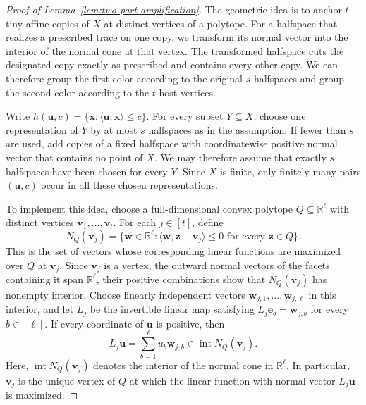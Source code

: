 \documentclass[11pt]{article}
\theoremstyle{definition}
\newcommand{\R}{\mathbb{R}}
\begin{document}
\begin{proof}[Proof of Lemma~\ref{lem:two-part-amplification}]
The geometric idea is to anchor \(t\) tiny affine copies of \(X\) at distinct vertices of a polytope. For a halfspace that realizes a prescribed trace on one copy, we transform its normal vector into the interior of the normal cone at that vertex. The transformed halfspace cuts the designated copy exactly as prescribed and contains every other copy. We can therefore group the first color according to the original \(s\) halfspaces and group the second color according to the \(t\) host vertices.

Write \(h(\boldsymbol{u},c)=\{\boldsymbol{x}:\langle\boldsymbol{u},\boldsymbol{x}\rangle\le c\}\). For every subset \(Y\subseteq X\), choose one representation of \(Y\) by at most \(s\) halfspaces as in the assumption. If fewer than \(s\) are used, add copies of a fixed halfspace with coordinatewise positive normal vector that contains no point of \(X\). We may therefore assume that exactly \(s\) halfspaces have been chosen for every \(Y\). Since \(X\) is finite, only finitely many pairs \((\boldsymbol{u},c)\) occur in all these chosen representations.

To implement this idea, choose a full-dimensional convex polytope \(Q\subseteq\R^{\ell}\) with distinct vertices \(\boldsymbol{v}_{1},\ldots,\boldsymbol{v}_{t}\). For each \(j\in[t]\), define
\[
N_{Q}(\boldsymbol{v}_{j})=\{\boldsymbol{w}\in\R^{\ell}:\langle\boldsymbol{w},\boldsymbol{z}-\boldsymbol{v}_{j}\rangle\le0\text{ for every }\boldsymbol{z}\in Q\}.
\]
This is the set of vectors whose corresponding linear functions are maximized over \(Q\) at \(\boldsymbol{v}_{j}\). Since \(\boldsymbol{v}_{j}\) is a vertex, the outward normal vectors of the facets containing it span \(\R^{\ell}\), their positive combinations show that \(N_{Q}(\boldsymbol{v}_{j})\) has nonempty interior. Choose linearly independent vectors \(\boldsymbol{w}_{j,1},\ldots,\boldsymbol{w}_{j,\ell}\) in this interior, and let \(L_{j}\) be the invertible linear map satisfying \(L_{j}\boldsymbol{e}_{b}=\boldsymbol{w}_{j,b}\) for every \(b\in[\ell]\). If every coordinate of \(\boldsymbol{u}\) is positive, then
\[
L_{j}\boldsymbol{u}=\sum_{b=1}^{\ell}u_{b}\boldsymbol{w}_{j,b}\in\operatorname{int}N_{Q}(\boldsymbol{v}_{j}).
\]
Here, \(\operatorname{int}N_{Q}(\boldsymbol{v}_{j})\) denotes the
interior of the normal cone in \(\R^{\ell}\). In particular, \(\boldsymbol{v}_{j}\) is the unique vertex of \(Q\) at which the linear function with normal vector \(L_{j}\boldsymbol{u}\) is maximized.


\end{proof}
\end{document}
